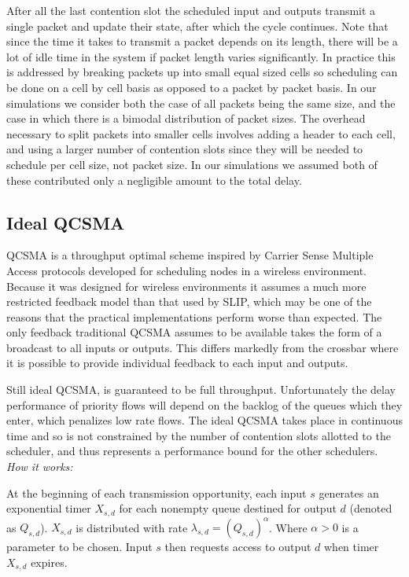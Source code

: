 \documentclass{IEEEtran}%
\begin{document}
After all the last contention slot the scheduled input and outputs transmit a single packet and update their state, after which the cycle continues.  Note that since the time it takes to transmit a packet depends on its length, there will be a lot of idle time in the system if packet length varies significantly.  In practice this is addressed by breaking packets up into small equal sized cells so scheduling can be done on a cell by cell basis as opposed to a packet by packet basis.  In our simulations we consider both the case of all packets being the same size, and the case in which there is a bimodal distribution of packet sizes.  The overhead necessary to split packets into smaller cells involves adding a header to each cell, and using a larger number of contention slots since they will be needed to schedule per cell size, not packet size.  In our simulations we assumed both of these contributed only a negligible amount to the total delay.

\subsection{Ideal QCSMA}


QCSMA is a throughput optimal scheme inspired by Carrier Sense Multiple Access protocols developed for scheduling nodes in a wireless environment.  Because it was designed for wireless environments it assumes a much more restricted feedback model than that used by SLIP, which may be one of the reasons that the practical implementations perform worse than expected.  The only feedback traditional QCSMA assumes to be available takes the form of a broadcast to all inputs or outputs. This differs markedly from the crossbar where it is possible to provide individual feedback to each input and outputs.%

Still ideal QCSMA, is guaranteed to be full throughput.  Unfortunately the delay performance of priority flows will depend on the backlog of the queues which they enter, which penalizes low rate flows.  The ideal QCSMA takes place in continuous time and so is not constrained by the number of contention slots allotted to the scheduler, and thus represents a performance bound for the other schedulers.\\

{\it How it works:}

At the beginning of each transmission opportunity, each input $s$ generates an exponential timer $X_{s,d}$ for each nonempty queue  destined for output $d$ (denoted as $Q_{s,d}$).  $X_{s,d}$ is distributed with rate $\lambda_{s,d} = (Q_{s,d})^{\alpha}$.  Where $\alpha > 0$ is a parameter to be chosen.  Input $s$ then requests access to output $d$ when timer $X_{s,d}$ expires. \\ %
\end{document}
